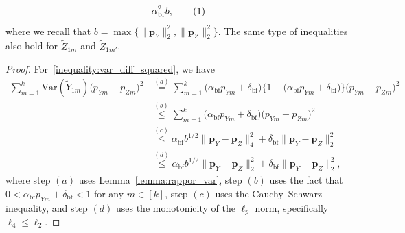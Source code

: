\documentclass[twoside,11pt]{article}
\newcommand\numberthis{\addtocounter{equation}{1}\tag{\theequation}}
\newcommand{\rvTwo}{Y}
\newcommand{\rvThree}{Z}
\newcommand{\private}[1]{\tilde{#1}}
\newcommand{\normSqMultinomMax}{b}
\newcommand{\alphabetSize}{k} %
\newcommand{\vectorIndex}{m}
\newcommand{\probVecElement}[2]{p_{{#1}{#2}}}
\newcommand{\probVec}{\mathbf{p}} %
\newcommand{\privacyParameter}{\alpha} %
\newcommand{\privacyParameterrappor}{\privacyParameter_{\mathrm{bf}}}
\newcommand{\smallNumber}{\delta}
\newcommand{\smallNumberrappor}{\smallNumber_{\mathrm{bf}}}
\begin{document}
\begin{appendix}
\begin{lemma}
\begin{align*}
			\privacyParameterrappor^2
			\normSqMultinomMax,
			\numberthis
			\label{inequality:cov_squared}
		\end{align*}
		where we recall  that
		$\normSqMultinomMax
		=
		\max \{
		\|\probVec_{\rvTwo}\|_2^2,
		\|\probVec_{\rvThree}\|_2^2\} 
		$.
		The same type of inequalities also hold for $\private{\rvThree}_{1 \vectorIndex}$ and $\private{\rvThree}_{1 \vectorIndex'}$.
	\end{lemma}
	\begin{proof}
		For~\eqref{inequality:var_diff_squared}, we have 
		\begin{align*}
			\sum_{\vectorIndex=1}^\alphabetSize
			\mathrm{Var}
			( %
			\private{\rvTwo}_{1 \vectorIndex}
			) %
			\bigl( %
			\probVecElement{\rvTwo}{\vectorIndex}
			- %
			\probVecElement{\rvThree}{\vectorIndex}
			\bigr)^2
			&\stackrel{(a)}{=}%
			\sum_{\vectorIndex=1}^\alphabetSize
			\bigl(
			\privacyParameterrappor 
			\probVecElement{\rvTwo}{\vectorIndex}
			+ \smallNumberrappor
			\bigr)
			\bigl\{
			1
			-
			\bigl(
			\privacyParameterrappor 
			\probVecElement{\rvTwo}{\vectorIndex}
			+ \smallNumberrappor
			\bigr)
			\bigr\}
			\bigl( %
			\probVecElement{\rvTwo}{\vectorIndex}
			- %
			\probVecElement{\rvThree}{\vectorIndex}
			\bigr)^2 %
			\\&\stackrel{(b)}{\leq}%
			\sum_{\vectorIndex=1}^\alphabetSize
			\bigl(
			\privacyParameterrappor 
			\probVecElement{\rvTwo}{\vectorIndex}
			+ \smallNumberrappor
			\bigr)
			\bigl( %
			\probVecElement{\rvTwo}{\vectorIndex}
			- %
			\probVecElement{\rvThree}{\vectorIndex}
			\bigr)^2 %
			\\&\stackrel{(c)}{\leq}%
			\privacyParameterrappor
			\normSqMultinomMax^{1/2}
			\|\probVec_{\rvTwo} - \probVec_{\rvThree}\|_4^2
			+
			\smallNumberrappor
			\|\probVec_{\rvTwo} - \probVec_{\rvThree}\|_2^2
			\\&\stackrel{(d)}{\leq}%
			\privacyParameterrappor
			\normSqMultinomMax^{1/2}
			\|\probVec_{\rvTwo} - \probVec_{\rvThree}\|_2^2
			+
			\smallNumberrappor
			\|\probVec_{\rvTwo} - \probVec_{\rvThree}\|_2^2,
		\end{align*}
		where step $(a)$ uses Lemma~\ref{lemma:rappor_var},
		step $(b)$ uses the fact that
		\( 0 < \privacyParameterrappor \probVecElement{\rvTwo}{\vectorIndex} + \smallNumberrappor < 1 \) for any $\vectorIndex \in [\alphabetSize]$,
		step $(c)$ uses the Cauchy--Schwarz inequality,
		and step $(d)$ uses the monotonicity of the $\ell_p$ norm, specifically $\ell_4 \leq \ell_2$.
		

\end{proof}
\end{appendix}
\end{document}
